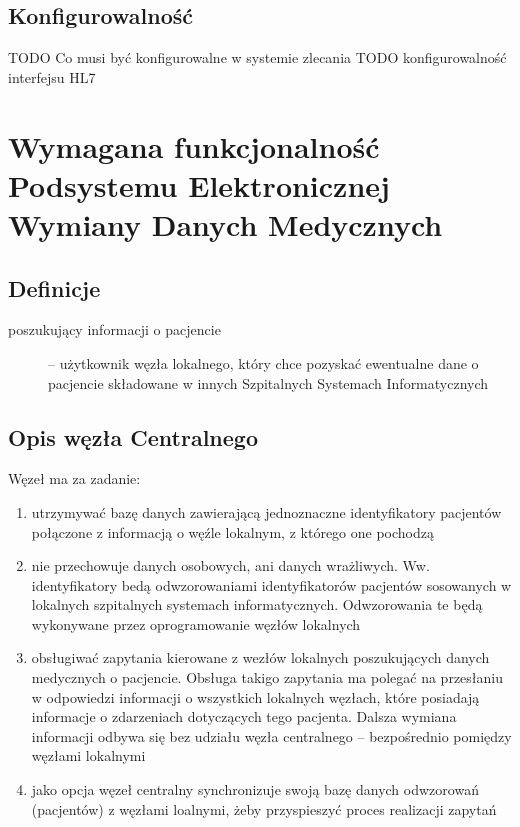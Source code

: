 \documentclass[a4paper]{article}
\begin{document}
\subsection{Konfigurowalność}

TODO Co musi być konfigurowalne w systemie zlecania 
TODO konfigurowalność interfejsu HL7

\section{Wymagana funkcjonalność Podsystemu Elektronicznej Wymiany Danych Medycznych}

\subsection{Definicje}
\begin{description}
\item[poszukujący informacji o pacjencie] – użytkownik węzła lokalnego, który chce pozyskać ewentualne dane o pacjencie składowane w innych Szpitalnych Systemach Informatycznych
\end{description}

\subsection{Opis węzła Centralnego}
Węzeł ma za zadanie:
\begin{enumerate}
\item utrzymywać bazę danych zawierającą jednoznaczne identyfikatory pacjentów połączone z informacją o węźle lokalnym, z którego one pochodzą
\item nie przechowuje danych osobowych, ani danych wrażliwych. Ww. identyfikatory bedą odwzorowaniami identyfikatorów pacjentów sosowanych w lokalnych szpitalnych systemach informatycznych. Odwzorowania te będą wykonywane przez oprogramowanie węzłów lokalnych
\item obsługiwać zapytania kierowane z wezłów lokalnych poszukujących danych medycznych o pacjencie. Obsługa takigo zapytania ma polegać na przesłaniu w odpowiedzi informacji o wszystkich lokalnych węzłach, które posiadają informacje o zdarzeniach dotyczących tego pacjenta. Dalsza wymiana informacji odbywa się bez udziału węzła centralnego – bezpośrednio pomiędzy węzłami lokalnymi
\item jako opcja węzeł centralny synchronizuje swoją bazę danych odwzorowań (pacjentów) z węzłami loalnymi, żeby przyspieszyć proces realizacji zapytań
\end{enumerate}
\end{document}
